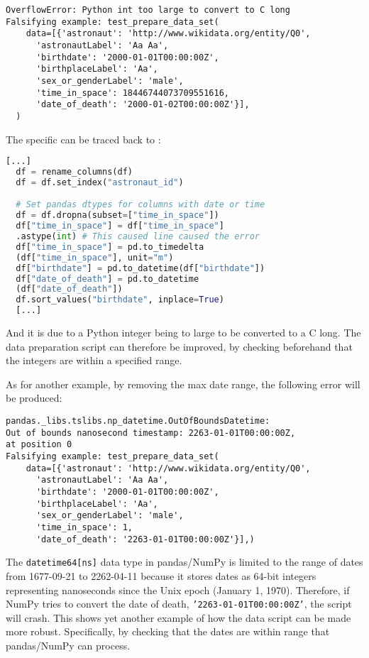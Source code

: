 \documentclass[runningheads]{llncs}
\begin{document}
\begin{verbatim}
OverflowError: Python int too large to convert to C long
Falsifying example: test_prepare_data_set(
    data=[{'astronaut': 'http://www.wikidata.org/entity/Q0',
      'astronautLabel': 'Aa Aa',
      'birthdate': '2000-01-01T00:00:00Z',
      'birthplaceLabel': 'Aa',
      'sex_or_genderLabel': 'male',
      'time_in_space': 18446744073709551616,
      'date_of_death': '2000-01-02T00:00:00Z'}],
  )
\end{verbatim}

\noindent The specific can be traced back to :

\begin{lstlisting}[language=Python]
  [...]
  df = rename_columns(df)
  df = df.set_index("astronaut_id")

  # Set pandas dtypes for columns with date or time
  df = df.dropna(subset=["time_in_space"])
  df["time_in_space"] = df["time_in_space"]
  .astype(int) # This caused line caused the error
  df["time_in_space"] = pd.to_timedelta
  (df["time_in_space"], unit="m")
  df["birthdate"] = pd.to_datetime(df["birthdate"])
  df["date_of_death"] = pd.to_datetime
  (df["date_of_death"])
  df.sort_values("birthdate", inplace=True)
  [...]
\end{lstlisting}
And it is due to a Python integer being to large to be converted to a C long. The data preparation script can therefore be improved, by checking beforehand that the integers are within a specified range.

\vspace{5mm}
\noindent As for another example, by removing the max date range, the following error will be produced:

\begin{verbatim}
pandas._libs.tslibs.np_datetime.OutOfBoundsDatetime: 
Out of bounds nanosecond timestamp: 2263-01-01T00:00:00Z, 
at position 0
Falsifying example: test_prepare_data_set(
    data=[{'astronaut': 'http://www.wikidata.org/entity/Q0',
      'astronautLabel': 'Aa Aa',
      'birthdate': '2000-01-01T00:00:00Z',
      'birthplaceLabel': 'Aa',
      'sex_or_genderLabel': 'male',
      'time_in_space': 1,
      'date_of_death': '2263-01-01T00:00:00Z'}],) 
\end{verbatim}

\vspace{5mm}
\noindent The \texttt{datetime64[ns]} data type in pandas/NumPy is limited to the range of dates from 1677-09-21 to 2262-04-11 because it stores dates as 64-bit integers representing nanoseconds since the Unix epoch (January 1, 1970). Therefore, if NumPy tries to convert the date of death, \texttt{'2263-01-01T00:00:00Z'}, the script will crash. This shows yet another example of how the data script can be made more robust. Specifically, by checking that the dates are within range that pandas/NumPy can process.
\end{document}
